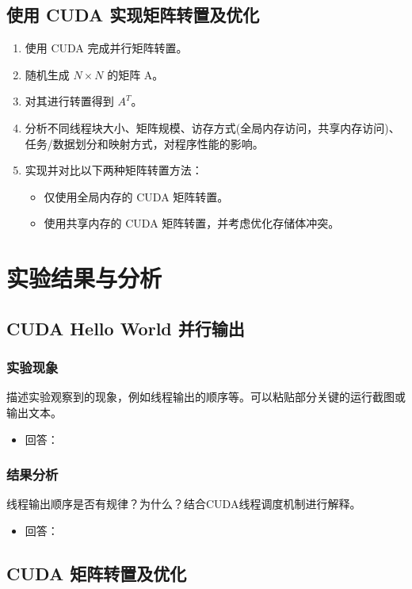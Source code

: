 \documentclass{SYSUReport}
\begin{document}
\subsection{使用 CUDA 实现矩阵转置及优化}
\begin{enumerate}
    \item 使用 CUDA 完成并行矩阵转置。 
    \item 随机生成 $N \times N$ 的矩阵 A。 
    \item 对其进行转置得到 $A^T$。 
    \item 分析不同线程块大小、矩阵规模、访存方式(全局内存访问，共享内存访问)、任务/数据划分和映射方式，对程序性能的影响。 
    \item 实现并对比以下两种矩阵转置方法：
    \begin{itemize}
        \item 仅使用全局内存的 CUDA 矩阵转置。 
        \item 使用共享内存的 CUDA 矩阵转置，并考虑优化存储体冲突。  
    \end{itemize}
\end{enumerate}
\section{实验结果与分析}
\subsection{CUDA Hello World 并行输出}
\subsubsection{实验现象}
描述实验观察到的现象，例如线程输出的顺序等。可以粘贴部分关键的运行截图或输出文本。
\begin{itemize}
    \item 回答：
\end{itemize}
\subsubsection{结果分析}
线程输出顺序是否有规律？为什么？结合CUDA线程调度机制进行解释。
\begin{itemize}
    \item 回答：
\end{itemize}
\subsection{CUDA 矩阵转置及优化}
\end{document}
